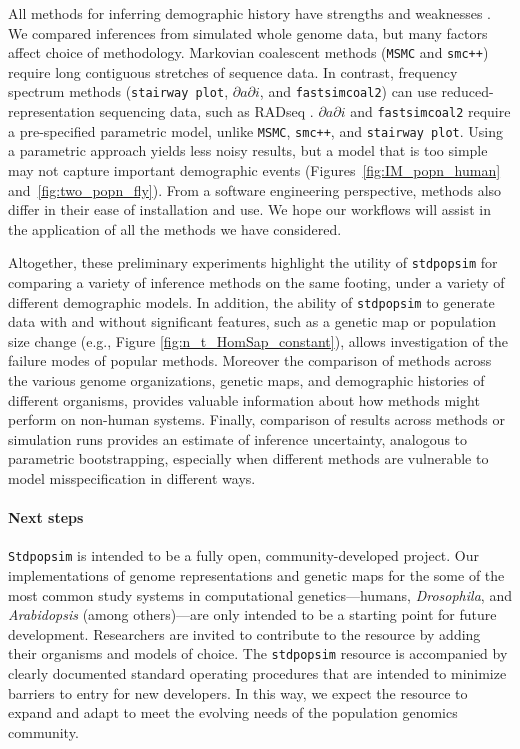 \documentclass[12pt,halfline,a4paper]{ouparticle}
\newcommand{\Stdpopsim}{\texttt{Stdpopsim}\xspace}
\newcommand{\stdpopsim}{\texttt{stdpopsim}\xspace}
\newcommand{\dadi}{$\partial a \partial i$\xspace}
\newcommand{\MSMC}{\texttt{MSMC}\xspace}
\newcommand{\smcpp}{\texttt{smc++}\xspace}
\newcommand{\stairwayplot}{\texttt{stairway plot}\xspace}
\newcommand{\fastsimcoal}{\texttt{fastsimcoal2}\xspace}
\begin{document}
All methods for inferring demographic history have strengths and weaknesses \citep[as recently reviewed by][]{beichman2018review}.
We compared inferences from simulated whole genome data, but many factors affect choice of methodology.
Markovian coalescent methods (\MSMC and \smcpp) require long contiguous stretches of sequence data.
In contrast, frequency spectrum methods (\stairwayplot, \dadi, and \fastsimcoal) can use reduced-representation sequencing data, such as RADseq \citep{andrews2016radseq}.
\dadi and \fastsimcoal require a pre-specified parametric model, unlike \MSMC, \smcpp, and \stairwayplot.
Using a parametric approach yields less noisy results, but a model that is too simple may not capture important demographic events (Figures~\ref{fig:IM_popn_human} and~\ref{fig:two_popn_fly}).
From a software engineering perspective, methods also differ in their ease of installation and use.
We hope our workflows will assist in the application of all the methods we have considered.

Altogether, these preliminary experiments highlight
the utility of \stdpopsim for comparing a variety of inference methods on
the same footing, under a variety of different demographic models.
In addition, the ability of \stdpopsim to generate data with and without significant features, such
as a genetic map or population size change (e.g., Figure \ref{fig:n_t_HomSap_constant}), allows
investigation of the failure modes of popular methods.
Moreover the comparison of methods across the various genome organizations, genetic maps,
and demographic histories of different organisms, provides valuable information
about how methods might perform on non-human systems.
Finally, comparison of results across methods or simulation runs
provides an estimate of inference uncertainty, analogous to parametric bootstrapping,
especially when different methods are vulnerable to model misspecification in different ways.

\paragraph{Next steps}
\Stdpopsim is intended to be a fully open, community-developed project.
Our implementations of genome representations and genetic maps for the some of
the most common study systems in computational genetics---humans, \textit{Drosophila},
and \textit{Arabidopsis} (among others)---are only intended to be a starting point for
future development.
Researchers are invited to contribute to the resource by adding their
organisms and models of choice. The \stdpopsim resource is
accompanied by clearly documented standard operating procedures that are
intended to minimize barriers to entry for new developers.  In this way, we
expect the resource to expand and adapt to meet the evolving needs of the
population genomics community.
\end{document}
